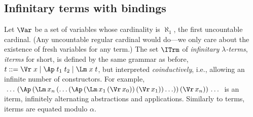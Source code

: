 
\vspace*{-0.5ex}\subsection{Infinitary terms with bindings}
\label{subsec-infTerms}

\newcommand\mydots{\makebox[0.8em][c]{.\hfil.\hfil.}}

Let $\Var$ be a set of variables whose cardinality is $\aleph_1$, the first uncountable  cardinal. 
(Any uncountable regular cardinal would %
do---we only care about %
the existence of fresh variables for any term.)  
%
The set $\ITrm$ of \emph{infinitary $\lambda$-terms}, \emph{iterms} for short,  %
is defined by the same grammar as before, 
%	
$
t ::= \Vr\;x  \mid \Ap\;t_1\;t_2  \mid \Lm\;x\;t
$, 
%
but interpreted \emph{coinductively}, i.e., allowing %
an infinite number of constructors. %
For example,  
$\;\ldots\,(\Ap\,(\Lm\,x_n\,(\ldots (\Ap\, (\Lm\,x_1\,(\Vr\,x_0))\,(\Vr\,x_1))\ldots))\,(\Vr\,x_n))\,\ldots\;$
 is an iterm, infinitely alternating abstractions and applications. 
%
%
Similarly to terms, iterms are equated %
modulo  $\alpha$. %
%


